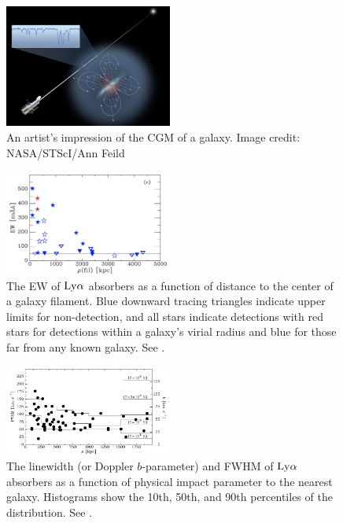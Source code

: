 \documentclass[twocolumn,tighten]{aastex62}
\begin{document}
\begin{figure}[ht!]
        \centering
        \vspace{0pt}
        \includegraphics[width=0.49\textwidth]{hubble_cgm.jpg}
        \caption{\small{An artist's impression of the CGM of a galaxy. Image credit: NASA/STScI/Ann Feild}}
        \vspace{5pt}
        \label{cgm_artist}
\end{figure}


\begin{figure}[ht!]
        \centering
        \vspace{0pt}
        \includegraphics[width=0.49\textwidth]{Wakker2015_filament_EW.png}
        \caption{\small{The EW of $\rm Ly\alpha$ absorbers as a function of distance to the center of a galaxy filament. Blue downward tracing triangles indicate upper limits for non-detection, and all stars indicate detections with red stars for detections within a galaxy's virial radius and blue for those far from any known galaxy. See \cite{wakker2015}.}}
        \vspace{5pt}
        \label{wakker_filament}
\end{figure}

\begin{figure}[ht!]
        \centering
        \vspace{0pt}
        \includegraphics[width=0.49\textwidth]{bart_moneyplot.png}
        \caption{\small{The linewidth (or Doppler $b$-parameter) and FWHM of $\rm Ly\alpha$ absorbers as a function of physical impact parameter to the nearest galaxy. Histograms show the 10th, 50th, and 90th percentiles of the distribution.  See \cite{wakker2009}.}}
        \vspace{5pt}
        \label{wakker2009_linewidth}
\end{figure}
\end{document}

